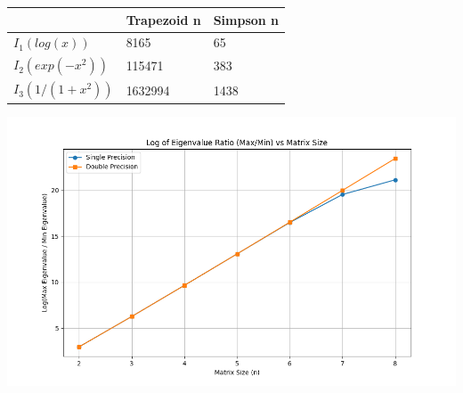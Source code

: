 \documentclass[11pt]{article}
\begin{document}
\begin{question}



\begin{table}[h]
	\centering
	\begin{tabular}{l l l}
		\toprule
		&Trapezoid n& Simpson n\\
		\midrule
		$I_1 (log(x))$&8165&65\\
		$I_2 (exp(-x^2))$&115471&383\\
		$I_3 (1/(1+x^2))$&1632994&1438\\
		\bottomrule
	\end{tabular}
\end{table}

\end{question}
\begin{question}

\begin{center}
	\includegraphics[width=\columnwidth]{3/a1.png}
\end{center}
\end{question}
\end{document}
